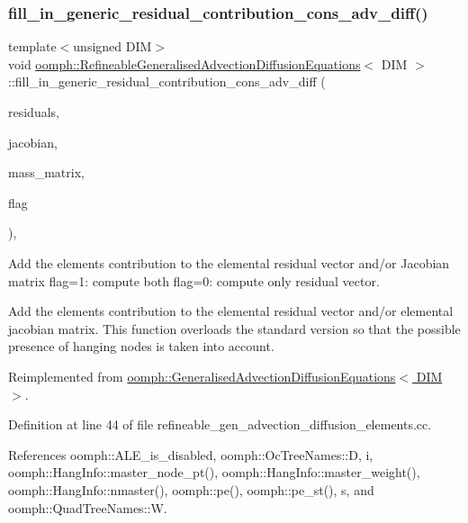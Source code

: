 \subsubsection{\texorpdfstring{fill\+\_\+in\+\_\+generic\+\_\+residual\+\_\+contribution\+\_\+cons\+\_\+adv\+\_\+diff()}{fill\_in\_generic\_residual\_contribution\_cons\_adv\_diff()}}
{\footnotesize\ttfamily template$<$unsigned D\+IM$>$ \\
void \hyperlink{classoomph_1_1RefineableGeneralisedAdvectionDiffusionEquations}{oomph\+::\+Refineable\+Generalised\+Advection\+Diffusion\+Equations}$<$ D\+IM $>$\+::fill\+\_\+in\+\_\+generic\+\_\+residual\+\_\+contribution\+\_\+cons\+\_\+adv\+\_\+diff (\begin{DoxyParamCaption}\item[{\hyperlink{classoomph_1_1Vector}{Vector}$<$ double $>$ \&}]{residuals,  }\item[{\hyperlink{classoomph_1_1DenseMatrix}{Dense\+Matrix}$<$ double $>$ \&}]{jacobian,  }\item[{\hyperlink{classoomph_1_1DenseMatrix}{Dense\+Matrix}$<$ double $>$ \&}]{mass\+\_\+matrix,  }\item[{unsigned}]{flag }\end{DoxyParamCaption})\hspace{0.3cm}{\ttfamily [protected]}, {\ttfamily [virtual]}}



Add the element\textquotesingle{}s contribution to the elemental residual vector and/or Jacobian matrix flag=1\+: compute both flag=0\+: compute only residual vector. 

Add the element\textquotesingle{}s contribution to the elemental residual vector and/or elemental jacobian matrix. This function overloads the standard version so that the possible presence of hanging nodes is taken into account. 

Reimplemented from \hyperlink{classoomph_1_1GeneralisedAdvectionDiffusionEquations_ae05de6e681f20f04f5ad9821f3a572c0}{oomph\+::\+Generalised\+Advection\+Diffusion\+Equations$<$ D\+I\+M $>$}.



Definition at line 44 of file refineable\+\_\+gen\+\_\+advection\+\_\+diffusion\+\_\+elements.\+cc.



References oomph\+::\+A\+L\+E\+\_\+is\+\_\+disabled, oomph\+::\+Oc\+Tree\+Names\+::D, i, oomph\+::\+Hang\+Info\+::master\+\_\+node\+\_\+pt(), oomph\+::\+Hang\+Info\+::master\+\_\+weight(), oomph\+::\+Hang\+Info\+::nmaster(), oomph\+::pe(), oomph\+::pe\+\_\+st(), s, and oomph\+::\+Quad\+Tree\+Names\+::W.



